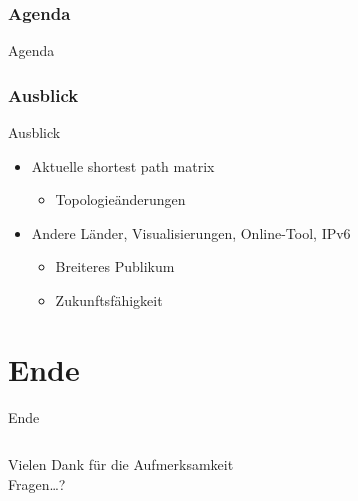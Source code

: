 \documentclass[ngerman,compress,hyperref={bookmarks}]{beamer}
\begin{document}
\section*{Agenda}
\begin{frame}{Agenda} \setcounter{tocdepth}{1} \tableofcontents[part=1] \setcounter{tocdepth}{3} \end{frame}

\section{Ausblick}
\begin{frame}{Ausblick}
\begin{itemize}
 \item Aktuelle shortest path matrix
 \begin{itemize}
  \item Topologieänderungen
 \end{itemize}\vspace{1cm}
 \item Andere Länder, Visualisierungen, Online-Tool, IPv6
 \begin{itemize}
  \item Breiteres Publikum
  \item Zukunftsfähigkeit
 \end{itemize}
\end{itemize}
\end{frame}

\part{Ende}
\begin{frame}{Ende}
\begin{columns}[t]
\begin{column}{0.5\textwidth}
 \begin{center}
 \vspace{1cm}
 Vielen Dank für die Aufmerksamkeit\\
 \vspace{1.5cm}
 Fragen\ldots?
 \end{center}
\end{column}
\begin{column}{0.5\textwidth}
 \vspace{-1cm}
 \begin{figure}
  \label{asngraph_all}
 \end{figure}
\end{column}
\end{columns}
\end{frame}
\end{document}
